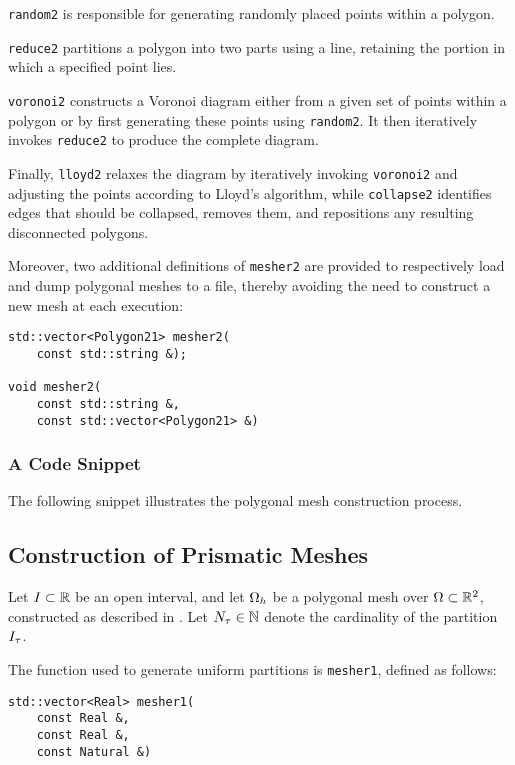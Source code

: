 \lstinline{random2} is responsible for generating randomly placed points within a polygon.

\lstinline{reduce2} partitions a polygon into two parts using a line, retaining the portion in which a specified point lies.

\lstinline{voronoi2} constructs a Voronoi diagram either from a given set of points within a polygon or by first generating these points using \lstinline{random2}. It then iteratively invokes \lstinline{reduce2} to produce the complete diagram.

Finally, \lstinline{lloyd2} relaxes the diagram by iteratively invoking \lstinline{voronoi2} and adjusting the points according to Lloyd's algorithm, while \lstinline{collapse2} identifies edges that should be collapsed, removes them, and repositions any resulting disconnected polygons.

\newpage
Moreover, two additional definitions of \lstinline{mesher2} are provided to respectively load and dump polygonal meshes to a file, thereby avoiding the need to construct a new mesh at each execution:
\begin{lstlisting}[style=cpp]
std::vector<Polygon21> mesher2(
    const std::string &);

void mesher2(
    const std::string &, 
    const std::vector<Polygon21> &)
\end{lstlisting}

\subsubsection{A Code Snippet}

The following snippet illustrates the polygonal mesh construction process.



\newpage
\subsection{Construction of Prismatic Meshes}

Let $I \subset \mathbb{R}$ be an open interval, and let $\Omega_{h}$ be a polygonal mesh over $\Omega \subset \mathbb{R}^{2}$, constructed as described in . Let $N_{\tau} \in \mathbb{N}$ denote the cardinality of the partition $I_{\tau}$.

The function used to generate uniform partitions is \lstinline{mesher1}, defined as follows:
\begin{lstlisting}[style=cpp]
std::vector<Real> mesher1(
    const Real &, 
    const Real &, 
    const Natural &)
\end{lstlisting}

